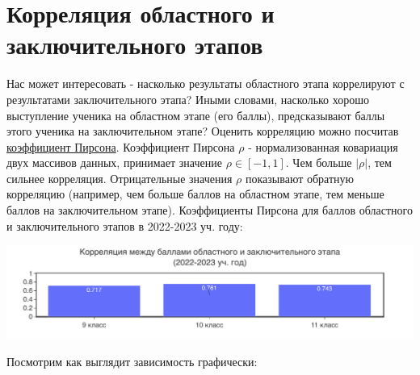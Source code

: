\section{Корреляция областного и заключительного этапов}
Нас может интересовать - насколько результаты областного этапа коррелируют с результатами заключительного этапа? Иными словами, насколько хорошо выступление ученика на областном этапе (его баллы), предсказывают баллы этого ученика на заключительном этапе? Оценить корреляцию можно посчитав \href{https://en.wikipedia.org/wiki/Pearson_correlation_coefficient}{коэффициент Пирсона}. Коэффициент Пирсона $\rho$ - нормализованная ковариация двух массивов данных, принимает значение $\rho \in [-1, 1]$. Чем больше $|\rho|$, тем сильнее корреляция. Отрицательные значения $\rho$ показывают обратную корреляцию (например, чем больше баллов на областном этапе, тем меньше баллов на заключительном этапе). Коэффициенты Пирсона для баллов областного и заключительного этапов в 2022-2023 уч. году:

\includegraphics[width=\linewidth]{../export/pdf/trajectory/bygrade.pdf}

Посмотрим как выглядит зависимость графически:


